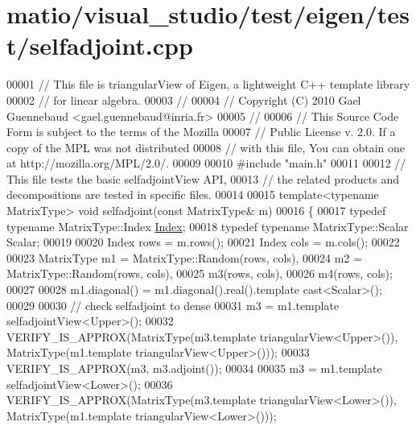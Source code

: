 \hypertarget{matio_2visual__studio_2test_2eigen_2test_2selfadjoint_8cpp_source}{}\section{matio/visual\+\_\+studio/test/eigen/test/selfadjoint.cpp}
\label{matio_2visual__studio_2test_2eigen_2test_2selfadjoint_8cpp_source}

\begin{DoxyCode}
00001 \textcolor{comment}{// This file is triangularView of Eigen, a lightweight C++ template library}
00002 \textcolor{comment}{// for linear algebra.}
00003 \textcolor{comment}{//}
00004 \textcolor{comment}{// Copyright (C) 2010 Gael Guennebaud <gael.guennebaud@inria.fr>}
00005 \textcolor{comment}{//}
00006 \textcolor{comment}{// This Source Code Form is subject to the terms of the Mozilla}
00007 \textcolor{comment}{// Public License v. 2.0. If a copy of the MPL was not distributed}
00008 \textcolor{comment}{// with this file, You can obtain one at http://mozilla.org/MPL/2.0/.}
00009 
00010 \textcolor{preprocessor}{#include "main.h"}
00011 
00012 \textcolor{comment}{// This file tests the basic selfadjointView API,}
00013 \textcolor{comment}{// the related products and decompositions are tested in specific files.}
00014 
00015 \textcolor{keyword}{template}<\textcolor{keyword}{typename} MatrixType> \textcolor{keywordtype}{void} selfadjoint(\textcolor{keyword}{const} MatrixType& m)
00016 \{
00017   \textcolor{keyword}{typedef} \textcolor{keyword}{typename} MatrixType::Index \hyperlink{namespace_eigen_a62e77e0933482dafde8fe197d9a2cfde}{Index};
00018   \textcolor{keyword}{typedef} \textcolor{keyword}{typename} MatrixType::Scalar Scalar;
00019 
00020   Index rows = m.rows();
00021   Index cols = m.cols();
00022 
00023   MatrixType m1 = MatrixType::Random(rows, cols),
00024              m2 = MatrixType::Random(rows, cols),
00025              m3(rows, cols),
00026              m4(rows, cols);
00027 
00028   m1.diagonal() = m1.diagonal().real().template cast<Scalar>();
00029 
00030   \textcolor{comment}{// check selfadjoint to dense}
00031   m3 = m1.template selfadjointView<Upper>();
00032   VERIFY\_IS\_APPROX(MatrixType(m3.template triangularView<Upper>()), MatrixType(m1.template 
      triangularView<Upper>()));
00033   VERIFY\_IS\_APPROX(m3, m3.adjoint());
00034 
00035   m3 = m1.template selfadjointView<Lower>();
00036   VERIFY\_IS\_APPROX(MatrixType(m3.template triangularView<Lower>()), MatrixType(m1.template 
      triangularView<Lower>()));

\end{DoxyCode}
